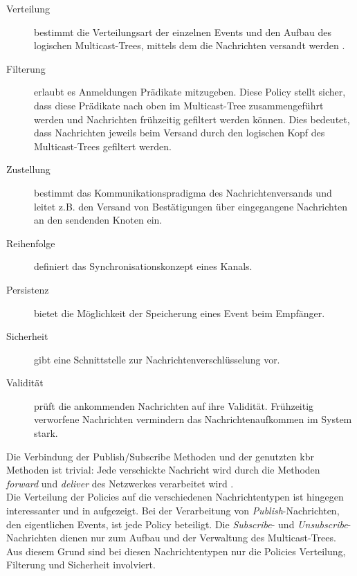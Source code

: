 \begin{description}
\item[Verteilung] bestimmt die Verteilungsart der einzelnen Events und den Aufbau des logischen Multicast-Trees, mittels dem die Nachrichten versandt werden \cite{KostasKatrinis2005}.
\item[Filterung] erlaubt es Anmeldungen Prädikate mitzugeben. Diese Policy stellt sicher, dass diese Prädikate nach oben im Multicast-Tree zusammengeführt werden und Nachrichten frühzeitig gefiltert werden können. Dies bedeutet, dass Nachrichten jeweils beim Versand durch den logischen Kopf des Multicast-Trees gefiltert werden.
\item[Zustellung] bestimmt das Kommunikationspradigma des Nachrichtenversands und leitet z.B. den Versand von Bestätigungen über eingegangene Nachrichten an den sendenden Knoten ein.
\item[Reihenfolge] definiert das Synchronisationskonzept eines Kanals.
\item[Persistenz] bietet die Möglichkeit der Speicherung eines Event beim Empfänger.
\item[Sicherheit] gibt eine Schnittstelle zur Nachrichtenverschlüsselung vor.
\item[Validität] prüft die ankommenden Nachrichten auf ihre Validität. Frühzeitig verworfene Nachrichten vermindern das Nachrichtenaufkommen im System stark.
\end{description}

Die Verbindung der Publish/Subscribe Methoden und der genutzten \ac{kbr} Methoden ist trivial: Jede verschickte Nachricht wird durch die Methoden \emph{forward} und \emph{deliver} des Netzwerkes verarbeitet wird \cite{Dabek2003Towards}.\\
Die Verteilung der Policies auf die verschiedenen Nachrichtentypen ist hingegen interessanter und in  aufgezeigt. Bei der Verarbeitung von \emph{Publish}-Nachrichten, den eigentlichen Events, ist jede Policy beteiligt. Die \emph{Subscribe}- und \emph{Unsubscribe}-Nachrichten dienen nur zum Aufbau und der Verwaltung des Multicast-Trees. Aus diesem Grund sind bei diesen Nachrichtentypen nur die Policies Verteilung, Filterung und Sicherheit involviert.

